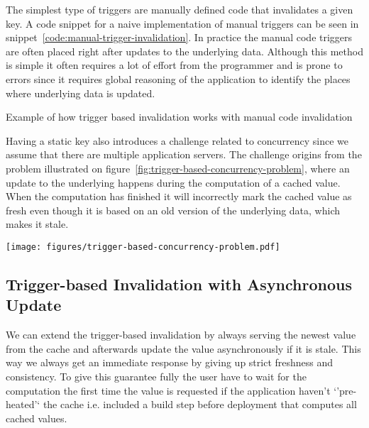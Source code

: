 The simplest type of triggers are manually defined code that invalidates a given key. A code snippet for a naive implementation of manual triggers can be seen in snippet~\ref{code:manual-trigger-invalidation}. In practice the manual code triggers are often placed right after updates to the underlying data. Although this method is simple it often requires a lot of effort from the programmer and is prone to errors since it requires global reasoning of the application to identify the places where underlying data is updated.

\begin{code}{Example of how trigger based invalidation works with manual code invalidation}
  
  \label{code:manual-trigger-invalidation}
\end{code}

Having a static key also introduces a challenge related to concurrency since we assume that there are multiple application servers. The challenge origins from the problem illustrated on figure~\ref{fig:trigger-based-concurrency-problem}, where an update to the underlying happens during the computation of a cached value. When the computation has finished it will incorrectly mark the cached value as fresh even though it is based on an old version of the underlying data, which makes it stale.

\begin{figure*}[ht!]
  \centering
  \texttt{[image: figures/trigger-based-concurrency-problem.pdf]}
  \caption{A scenario of the trigger-based invalidation that results in a race condition, where the cached value are being incorrectly marked as valid even though it is storing a stale value.}
  \label{fig:trigger-based-concurrency-problem}
\end{figure*}


\subsection{Trigger-based Invalidation with Asynchronous Update}
\label{subsec:trigger-based-invalidation-with-asynchronous-update}

We can extend the trigger-based invalidation by always serving the newest value from the cache and afterwards update the value asynchronously if it is stale. This way we always get an immediate response by giving up strict freshness and consistency. To give this guarantee fully the user have to wait for the computation the first time the value is requested if the application haven't `'pre-heated'` the cache i.e. included a build step before deployment that computes all cached values.

